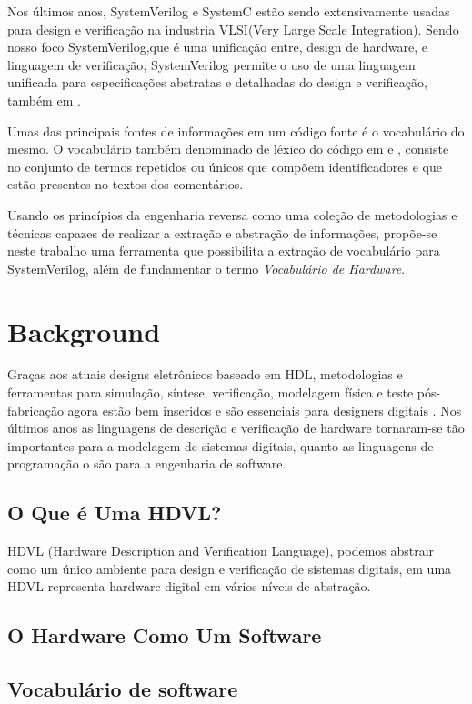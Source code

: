 \documentclass[12pt, twocolumn, a4paper]{article}
\begin{document}
Nos últimos anos, SystemVerilog e SystemC estão sendo extensivamente usadas para design e verificação na industria VLSI(Very Large Scale Integration)\cite{Kumar2014}. Sendo nosso foco SystemVerilog,que é uma unificação entre, design de hardware, e linguagem de verificação\cite{IEEEComputerSociety2013}, SystemVerilog permite o uso de uma linguagem unificada para especificações abstratas e detalhadas do design e verificação, também em \cite{IEEEComputerSociety2013}.

Umas das principais fontes de informações em um código fonte é o vocabulário do mesmo. O vocabulário também denominado de léxico do código em \cite{Host2007} e \cite{Antoniol2007}, consiste no conjunto de termos repetidos ou únicos que compõem identificadores e que estão presentes no textos dos comentários\cite{Abebe2009}.

Usando os princípios da engenharia reversa como uma coleção de metodologias e técnicas capazes de realizar a extração e abstração de informações\cite{BENEDUSI1992225}, propõe-se neste trabalho uma ferramenta que possibilita a extração de vocabulário para SystemVerilog, além de fundamentar o termo \textit{Vocabulário de Hardware}.

	\section{Background}
\quad Graças aos atuais designs eletrônicos baseado em HDL, metodologias e ferramentas para simulação, síntese, verificação, modelagem física e teste pós-fabricação agora estão bem inseridos e são essenciais para designers digitais \cite{Navabi2015}. Nos últimos anos as linguagens de descrição e verificação de hardware tornaram-se tão importantes para a modelagem de sistemas digitais, quanto as linguagens de programação o são para a engenharia de software. 
	\subsection{O Que é Uma HDVL?}
\quad HDVL (Hardware Description and Verification Language), podemos abstrair como um único ambiente para design e verificação de sistemas digitais, em \cite{Flake} uma HDVL representa hardware digital em vários níveis de abstração.
	\subsection{O Hardware Como Um Software}
\quad 
	\subsection{Vocabulário de software}
\quad
\end{document}

